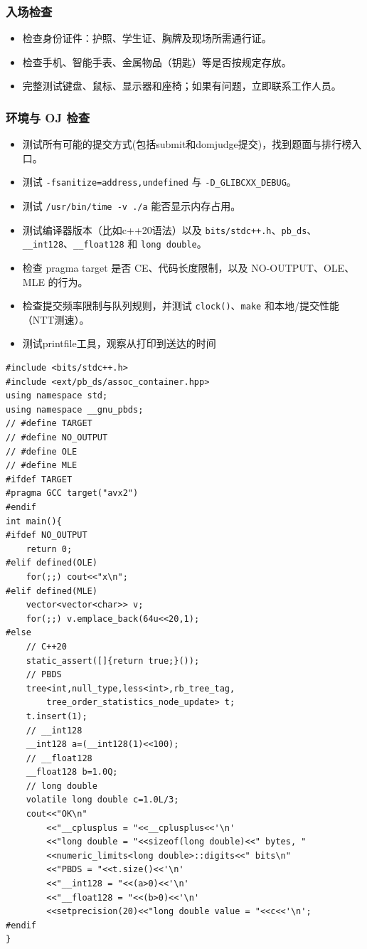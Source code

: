 \subsubsection{入场检查}
\begin{itemize}[leftmargin=5mm]
  \setlength{\itemsep}{0pt}
  \item 检查身份证件：护照、学生证、胸牌及现场所需通行证。
  \item 检查手机、智能手表、金属物品（钥匙）等是否按规定存放。
  \item 完整测试键盘、鼠标、显示器和座椅；如果有问题，立即联系工作人员。
\end{itemize}

\subsubsection{环境与 OJ 检查}
\begin{itemize}[leftmargin=5mm]
  \setlength{\itemsep}{0pt}
  \item 测试所有可能的提交方式(包括submit和domjudge提交)，找到题面与排行榜入口。
  \item 测试 \texttt{-fsanitize=address,undefined} 与 \texttt{-D\_GLIBCXX\_DEBUG}。
  \item 测试 \texttt{/usr/bin/time -v ./a} 能否显示内存占用。
  \item 测试编译器版本（比如c++20语法）以及 \texttt{bits/stdc++.h}、\texttt{pb\_ds}、\texttt{\_\_int128}、\texttt{\_\_float128} 和 \texttt{long double}。
  \item 检查 pragma target 是否 CE、代码长度限制，以及 NO-OUTPUT、OLE、MLE 的行为。
  \item 检查提交频率限制与队列规则，并测试 \texttt{clock()}、\texttt{make} 和本地/提交性能（NTT测速）。
  \item 测试printfile工具，观察从打印到送达的时间
\end{itemize}

\begin{verbatim}
#include <bits/stdc++.h>
#include <ext/pb_ds/assoc_container.hpp>
using namespace std;
using namespace __gnu_pbds;
// #define TARGET
// #define NO_OUTPUT
// #define OLE
// #define MLE
#ifdef TARGET
#pragma GCC target("avx2")
#endif
int main(){
#ifdef NO_OUTPUT
    return 0;
#elif defined(OLE)
    for(;;) cout<<"x\n";
#elif defined(MLE)
    vector<vector<char>> v;
    for(;;) v.emplace_back(64u<<20,1);
#else
    // C++20
    static_assert([]{return true;}());
    // PBDS
    tree<int,null_type,less<int>,rb_tree_tag,
        tree_order_statistics_node_update> t;
    t.insert(1);
    // __int128
    __int128 a=(__int128(1)<<100);
    // __float128
    __float128 b=1.0Q;
    // long double
    volatile long double c=1.0L/3;
    cout<<"OK\n"
        <<"__cplusplus = "<<__cplusplus<<'\n'
        <<"long double = "<<sizeof(long double)<<" bytes, "
        <<numeric_limits<long double>::digits<<" bits\n"
        <<"PBDS = "<<t.size()<<'\n'
        <<"__int128 = "<<(a>0)<<'\n'
        <<"__float128 = "<<(b>0)<<'\n'
        <<setprecision(20)<<"long double value = "<<c<<'\n';
#endif
}
\end{verbatim}


